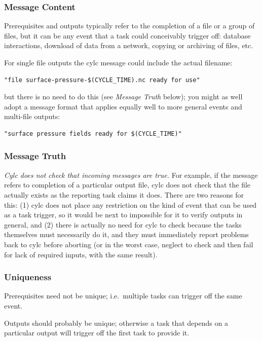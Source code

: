 \documentclass[11pt,a4paper]{article}
\begin{document}
\subsubsection{Message Content}

Prerequisites and outputs typically refer to the completion of a file or
a group of files, but it can be any event that a task could conceivably
trigger off: database interactions, download of data from a network,
copying or archiving of files, etc.

For single file outputs the cylc message could include the actual
filename:
\begin{lstlisting}
"file surface-pressure-$(CYCLE_TIME).nc ready for use"
\end{lstlisting}
but there is no need to do this (see {\em Message Truth} below); you
might as well adopt a message format that applies equally well to
more general events and multi-file outputs:
\begin{lstlisting}
"surface pressure fields ready for $(CYCLE_TIME)"
\end{lstlisting}


\subsubsection{Message Truth}

{\em Cylc does not check that incoming messages are true.}  For example,
if the message refers to completion of a particular output file, cylc
does not check that the file actually exists as the reporting task
claims it does. There are two reasons for this: (1) cylc does not place
any restriction on the kind of event that can be used as a task trigger,
so it would be next to impossible for it to verify outputs in general,
and (2) there is actually no need for cylc to check because the tasks
themselves must necessarily do it, and they must immediately report
problems back to cylc before aborting (or in the worst case, neglect to
check and then fail for lack of required inputs, with the same result).


\subsubsection{Uniqueness}

Prerequisites need not be unique; i.e.\ multiple tasks can trigger off
the same event.

Outputs should probably be unique; otherwise a task that depends on a
particular output will trigger off the first task to provide it.
\end{document}
